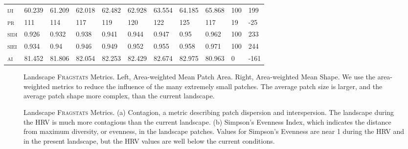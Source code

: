 \begin{landscape}
\begin{table}[!htbp]
\begin{tabular}{@{}lllllllllll@{}}
\small \textsc{iji }            & 60.239        & 61.209        & 62.018          & 62.482         & 62.928         & 63.554          & 64.185          & 65.868        & 100       & 199     \\
\small \textsc{pr}              & 111        & 114        & 117          & 119         & 120         & 122          & 125          & 117           & 19       & -25     \\
\small \textsc{sidi}            & 0.926        & 0.932        & 0.938          & 0.941         & 0.944         & 0.947          & 0.95          & 0.962         & 100       & 233     \\
\small \textsc{siei}            & 0.934        & 0.94        & 0.946          & 0.949         & 0.952         & 0.955          & 0.958          & 0.971         & 100       & 244     \\
\small \textsc{ai}              & 81.452        & 81.806        & 82.054          & 82.253         & 82.429         & 82.674          & 82.975          & 80.963        & 0       & -161     \\ \bottomrule
\end{tabular}
\end{table}
\end{landscape}


\clearpage
{}
\begin{figure}[!htbp]
  \centering
\caption{Landscape \textsc{Fragstats} Metrics. Left, Area-weighted Mean Patch Area. Right, Area-weighted Mean Shape. We use the area-weighted metrics to reduce the influence of the many extremely small patches. The average patch size is larger, and the average patch shape more complex, than the current landscape.} 
\label{fig:fragland_areashape}
\end{figure}

\begin{figure}[!htbp]
  \centering
\caption{Landscape \textsc{Fragstats} Metrics. (a) Contagion, a metric describing patch dispersion and interspersion. The landscape during the HRV is much more contagious than the current landscape. (b) Simpson's Evenness Index, which indicates the distance from maximum diversity, or evenness, in the landscape patches. Values for Simpson's Evenness are near 1 during the HRV and in the present landscape, but the HRV values are well below the current conditions.} 
\label{fig:fragland_contagsiei}
\end{figure}

